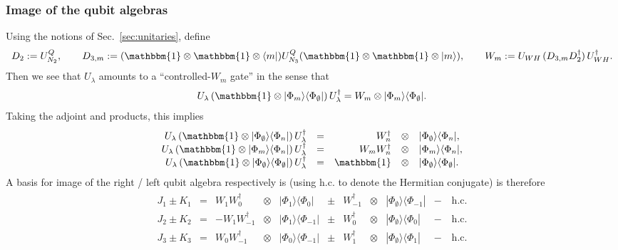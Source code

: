 \documentclass[aps,nofootinbib,floatfix,a4paper]{revtex4}
\newcommand{\1}{\mbox{$\mathbf{1}$}}
\def\Id{\mathbbm{1}}
\begin{document}
\subsubsection{Image of the qubit algebras}
\label{sec:qubit_algebras}

Using the notions of Sec.~\ref{sec:unitaries}, define
\begin{align*}
	D_2 := 
	U^Q_{N_2},
	\qquad
	D_{3,m} :=
	(\Id\otimes\Id\otimes\langle m|)
		U^Q_{N_3}
	(\Id\otimes\Id\otimes|m\rangle),
	\qquad
	W_m
	:= 
	U_{WH} \,(D_{3,m} D_2^\dagger)\, U_{WH}^\dagger.
\end{align*}
Then we see that $U_\lambda$ amounts to a ``controlled-$W_m$ gate'' in the sense that
\begin{align}\label{eqn:controlled_wm}
	U_\lambda\, (\Id\otimes |\Phi_m\rangle\langle\Phi_\emptyset|) \,U_\lambda^\dagger
	=
	W_m \otimes |\Phi_m\rangle\langle\Phi_\emptyset| .
\end{align}
Taking the adjoint and products, this implies
\begin{align*}
	\begin{array}{rcrcl}
	U_\lambda\, (\Id\otimes |\Phi_\emptyset\rangle\langle\Phi_n|) \,U_\lambda^\dagger
	&=&
		W_n^\dagger &\otimes& |\Phi_\emptyset\rangle\langle\Phi_n| ,
	\\
			U_\lambda\, (\Id\otimes |\Phi_m\rangle\langle\Phi_n|) \,U_\lambda^\dagger
								&=&
		W_m W_n^\dagger &\otimes& |\Phi_m\rangle\langle\Phi_n|, \\
			U_\lambda\, (\Id\otimes |\Phi_\emptyset\rangle\langle\Phi_\emptyset|) \,U_\lambda^\dagger
										&=&
		\Id&\otimes& |\Phi_\emptyset\rangle\langle\Phi_\emptyset|
			.
	\end{array}
\end{align*}
A basis for image of the right / left qubit algebra respectively is
(using $\mathrm{h.c.}$ to denote the Hermitian conjugate) is therefore
\begin{align*}
	\begin{array}{lcrclcllll}
		J_1 \pm K_1
		&=&
		W_{1} W_{0}^\dagger &\otimes& |\Phi_{1}\rangle\langle \Phi_{0}|
												&\pm&
		W_{-1}^\dagger &\otimes& |\Phi_\emptyset\rangle\langle\Phi_{-1}| 
												&-\quad\mathrm{h.c.}
		\\
		J_2 \pm K_2
												&=&
		-
		W_{1} W_{-1}^\dagger &\otimes& |\Phi_{1}\rangle\langle \Phi_{-1}|
												 &\pm&
		W_{0}^\dagger &\otimes& |\Phi_\emptyset\rangle\langle\Phi_{0}| 
												 &-\quad\mathrm{h.c.}
		\\
		J_3 \pm K_3
												 &=&
		W_{0} W_{-1}^\dagger &\otimes& |\Phi_{0}\rangle\langle \Phi_{-1}|
												 &\pm&
		W_{1}^\dagger &\otimes& |\Phi_\emptyset\rangle\langle\Phi_{1}| 
												 &-\quad\mathrm{h.c.}
	\end{array}
\end{align*}
\end{document}
